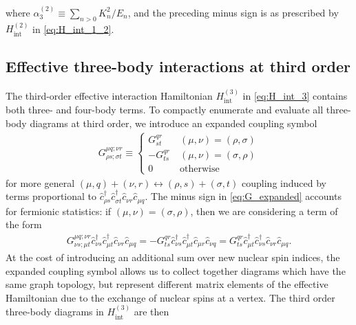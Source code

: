 \documentclass[preprint,showkeys,nofootinbib]{revtex4-1}
\renewcommand{\t}{\text} %
\newcommand{\p}[1]{\left(#1\right)} %
\renewcommand{\c}{\hat{c}}
\newcommand{\1}{\mathds{1}}
\begin{document}
where $\alpha_3^{(2)} \equiv \sum_{n>0} K_n^2/E_n$, and the preceding
minus sign is as prescribed by $H_{\t{int}}^{(2)}$ in
\eqref{eq:H_int_1_2}.


\subsection{Effective three-body interactions at third order}

The third-order effective interaction Hamiltonian $H_{\t{int}}^{(3)}$
in \eqref{eq:H_int_3} contains both three- and four-body terms.  To
compactly enumerate and evaluate all three-body diagrams at third
order, we introduce an expanded coupling symbol
\begin{align}
  G^{\mu q;\nu r}_{\rho s;\sigma t} \equiv \left\{
    \begin{array}{ll}
      G^{qr}_{st} & ~ \p{\mu,\nu} = \p{\rho,\sigma}
      \\
      - G^{qr}_{ts} & ~ \p{\mu,\nu} = \p{\sigma,\rho}
      \\
      0 & ~ \t{otherwise}
    \end{array}\right.
  \label{eq:G_expanded}
\end{align}
for more general
$\p{\mu,q}+\p{\nu,r}\leftrightarrow\p{\rho,s}+\p{\sigma,t}$ coupling
induced by terms proportional to
$\c_{\rho s}^\dag \c_{\sigma t}^\dag \c_{\nu r} \c_{\mu q}$.  The
minus sign in \eqref{eq:G_expanded} accounts for fermionic statistics:
if $\p{\mu,\nu}=\p{\sigma,\rho}$, then we are considering a term of
the form
\begin{align}
  G^{\mu q;\nu r}_{\nu s;\mu t}
  \c_{\nu s}^\dag \c_{\mu t}^\dag \c_{\nu r} \c_{\mu q}
  = -G^{qr}_{ts} \c_{\nu s}^\dag \c_{\mu t}^\dag \c_{\mu r} \c_{\nu q}
  = G^{qr}_{ts} \c_{\mu t}^\dag \c_{\nu s}^\dag \c_{\nu r} \c_{\mu q}.
\end{align}
At the cost of introducing an additional sum over new nuclear spin
indices, the expanded coupling symbol allows us to collect together
diagrams which have the same graph topology, but represent different
matrix elements of the effective Hamiltonian due to the exchange of
nuclear spins at a vertex.  The third order three-body diagrams in
$H_{\t{int}}^{(3)}$ are then
\end{document}
